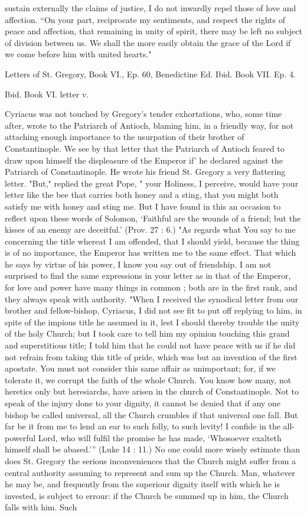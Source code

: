 sustain externally the claims of justice, I do not inwardly repel those of love and affection. “On your part, reciprocate my sentiments, and respect the rights of peace and affection, that remaining in unity of spirit, there may be left no subject of division between us. We shall the more easily obtain the grace of the Lord if we come before him with united hearts."

Letters of St. Gregory, Book VI., Ep. 60, Benedictine Ed. Ibid. Book VII. Ep. 4.

Ibid. Book VI. letter v.

Cyriacus was not touched by Gregory's tender exhortations, who, some time after, wrote to the Patriarch of Antioch, blaming him, in a friendly way, for not attaching enough importance to the usurpation of their brother of Constantinople. We see by that letter that the Patriarch of Antioch feared to draw upon himself the displeasure of the Emperor if' he declared against the Patriarch of Constantinople. He wrote his friend St. Gregory a very flattering letter. "But," replied the great Pope, " your Holiness, I perceive, would have your letter like the bee that carries both honey and a sting, that you might both satisfy me with honey and sting me. But I have found in this an occasion to reflect upon these words of Solomon, ‘Faithful are the wounds of a friend; but the kisses of an enemy are deceitful.' (Prov. 27 : 6.) "As regards what You say to me concerning the title whereat I am offended, that I should yield, because the thing is of no importance, the Emperor has written me to the same effect. That which he says by virtue of his power, I know you say out of friendship. I am not surprised to find the same expressions in your letter as in that of the Emperor, for love and power have many things in common ; both are in the first rank, and they always speak with authority. "When I received the synodical letter from our brother and fellow-bishop, Cyriacus, I did not see fit to put off replying to him, in spite of the impious title he assumed in it, lest I should thereby trouble the unity of the holy Church; but I took care to tell him my opinion touching this grand and superstitious title; I told him that he could not have peace with us if he did not refrain from taking this title of pride, which was but an invention of the first apostate. You must not consider this same affair as unimportant; for, if we tolerate it, we corrupt the faith of the whole Church. You know how many, not heretics only but heresiarchs, have arisen in the church of Constantinople. Not to speak of the injury done to your dignity, it cannot be denied that if any one bishop be called universal, all the Church crumbles if that universal one fall. But far be it from me to lend an ear to such folly, to such levity! I confide in the all-powerful Lord, who will fulfil the promise he has made, ‘Whosoever exalteth himself shall be abased.’” (Luke 14 : 11.) No one could more wisely estimate than does St. Gregory the serious inconveniences that the Church might suffer from a central authority assuming to represent and sum up the Church. Man, whatever he may be, and frequently from the superiour dignity itself with which he is invested, is subject to errour: if the Church be summed up in him, the Church falls with him. Such 